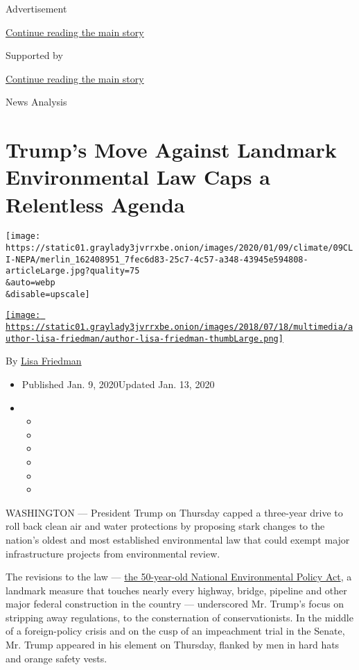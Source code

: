Advertisement

\protect\hyperlink{after-top}{Continue reading the main story}

Supported by

\protect\hyperlink{after-sponsor}{Continue reading the main story}

News Analysis

\hypertarget{trumps-move-against-landmark-environmental-law-caps-a-relentless-agenda}{%
\section{Trump's Move Against Landmark Environmental Law Caps a
Relentless
Agenda}\label{trumps-move-against-landmark-environmental-law-caps-a-relentless-agenda}}

\texttt{[image: https://static01.graylady3jvrrxbe.onion/images/2020/01/09/climate/09CLI-NEPA/merlin\_162408951\_7fec6d83-25c7-4c57-a348-43945e594808-articleLarge.jpg?quality=75\\\&auto=webp\\\&disable=upscale]}

\href{https://www.nytimes3xbfgragh.onion/by/lisa-friedman}{\texttt{[image: https://static01.graylady3jvrrxbe.onion/images/2018/07/18/multimedia/author-lisa-friedman/author-lisa-friedman-thumbLarge.png]}}

By \href{https://www.nytimes3xbfgragh.onion/by/lisa-friedman}{Lisa
Friedman}

\begin{itemize}
\item
  Published Jan. 9, 2020Updated Jan. 13, 2020
\item
  \begin{itemize}
  \item
  \item
  \item
  \item
  \item
  \item
  \end{itemize}
\end{itemize}

WASHINGTON --- President Trump on Thursday capped a three-year drive to
roll back clean air and water protections by proposing stark changes to
the nation's oldest and most established environmental law that could
exempt major infrastructure projects from environmental review.

The revisions to the law ---
\href{https://www.nytimes3xbfgragh.onion/2020/01/03/climate/trump-nepa-climate-change.html}{the
50-year-old National Environmental Policy Act}, a landmark measure that
touches nearly every highway, bridge, pipeline and other major federal
construction in the country --- underscored Mr. Trump's focus on
stripping away regulations, to the consternation of conservationists. In
the middle of a foreign-policy crisis and on the cusp of an impeachment
trial in the Senate, Mr. Trump appeared in his element on Thursday,
flanked by men in hard hats and orange safety vests.


